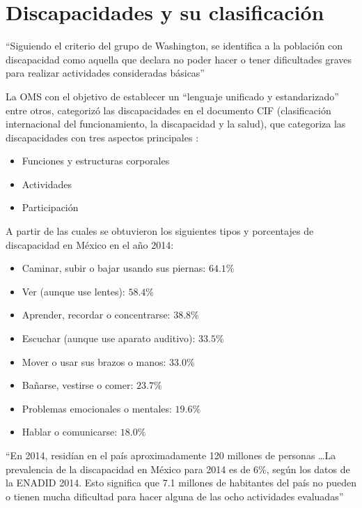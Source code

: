 \section{Discapacidades y su clasificaci\'on}

``Siguiendo el criterio del grupo de Washington, se identifica a la
 poblaci\'on con discapacidad como aquella que declara no poder hacer 
 o tener dificultades graves para realizar actividades consideradas 
 b\'asicas''\cite{INEGI2014}


La OMS con el objetivo de establecer un ``lenguaje unificado y
 estandarizado''\cite{9241545429} entre otros, categoriz\'o las 
 discapacidades en el documento CIF (clasificaci\'on internacional 
 del funcionamiento, la discapacidad y la salud), que categoriza 
 las discapacidades con tres aspectos principales \cite{9241545429}:


\begin{itemize}
	\item Funciones y estructuras corporales
	\item Actividades
	\item Participaci\'on
\end{itemize}


A partir de las cuales se obtuvieron los siguientes tipos y porcentajes 
 de discapacidad en M\'exico en el a\~no 2014\cite{INEGI2014}:


\begin{itemize}
	\item {Caminar, subir o bajar usando sus piernas: $64.1\%$ }
	\item {Ver (aunque use lentes): $58.4\%$ }
  	\item {Aprender, recordar o concentrarse: $38.8\%$ } 
	\item {Escuchar (aunque use aparato auditivo): $33.5\%$ } 
	\item {Mover o usar sus brazos o manos: $33.0\%$ }
 	\item {Ba\~narse, vestirse o comer: $23.7\%$ }
	\item {Problemas emocionales o mentales: $19.6\%$ }
	\item {Hablar o comunicarse: $18.0\%$ }
\end{itemize}


``En 2014, resid\'ian en el pa\'is aproximadamente 120 millones de personas
 \ldots La prevalencia de la discapacidad en M\'exico para 2014 es de $6\%$, 
 seg\'un los datos de la ENADID 2014. Esto significa que 7.1 millones de 
 habitantes del pa\'is no pueden o tienen mucha dificultad para hacer 
 alguna de las ocho actividades evaluadas''\cite{INEGI2014}


